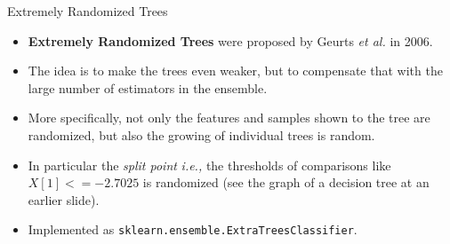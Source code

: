 \documentclass[10pt, aspectratio=169]{beamer} %
\begin{document}
\begin{frame}{Extremely Randomized Trees}
\begin{itemize}
	
	\item \textbf{Extremely Randomized Trees} were proposed by
	Geurts \emph{et al.} in 2006. 
	\item The idea is to make the trees even weaker, but to compensate that with the
	large number of estimators in the ensemble. 
	\item More specifically, not only the features and samples shown to the
	tree are randomized, but also the growing of individual trees is random.
	\item In particular the \emph{split point}
	\emph{i.e.,} the thresholds of comparisons like $X[1] <= -2.7025$ is randomized (see 
	the graph of a decision tree at an earlier slide).

\item Implemented as \texttt{sklearn.ensemble.ExtraTreesClassifier}.

\end{itemize}
\end{frame}
\end{document}

